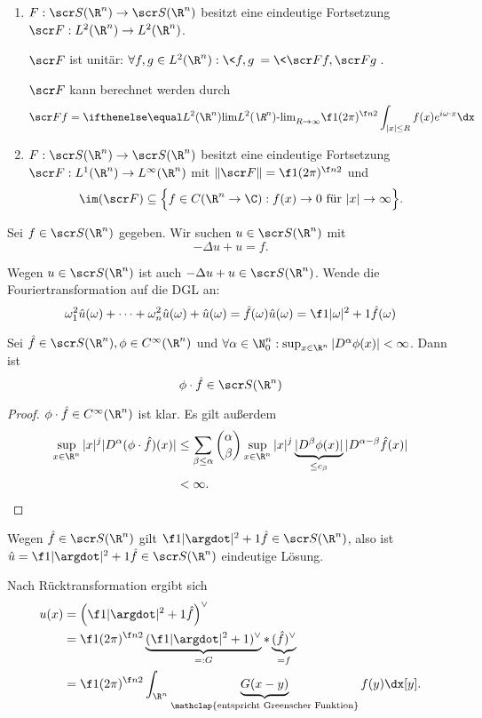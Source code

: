 \begin{nt}[Fortsetzungen] \label{4.31}
	\begin{enumerate}[1)]
		\item
			$F: \scr S(\R^n) \to \scr S(\R^n)$ besitzt eine eindeutige Fortsetzung $\scr F: L^2(\R^n) \to L^2(\R^n)$.

			$\scr F$ ist unitär: $\forall f, g \in L^2(\R^n) : \<f,g\> = \<\scr F f, \scr F g\>$.

			$\scr F$ kann berechnet werden durch
			\[
				\scr F f = \lim[L^2(\R^n)]_{R\to \infty} \f 1{(2\pi)^{\f n2}} \int_{|x|\le R} f(x) e^{i \omega\cdot x} \dx
			\]
		\item
			$F : \scr S(\R^n) \to \scr S(\R^n)$ besitzt eine eindeutige Fortsetzung $\scr F: L^1(\R^n) \to L^\infty(\R^n)$ mit $\| \scr F \| = \f 1{(2\pi)^{\f n2}}$ und
			\[
				\im (\scr F) \subset \Big\{ f \in C(\R^n \to \C) : f(x) \to 0 \text{ für $|x| \to \infty$} \Big\}.
			\]
	\end{enumerate}
\end{nt}

\begin{ex} \label{4.30}
	Sei $f \in \scr S(\R^n)$ gegeben.
	Wir suchen $u \in \scr S(\R^n)$ mit
	\[
		- \Delta u + u = f.
	\]

	Wegen $u \in \scr S(\R^n)$ ist auch $-\Delta u + u \in \scr S(\R^n)$.
	Wende die Fouriertransformation auf die DGL an:
	\[
		\omega_1^2 \hat u(\omega) + \dotsb + \omega_n^2 \hat u(\omega) + \hat u(\omega) = \hat f(\omega)
		\hat u (\omega) = \f 1{|\omega|^2 + 1} \hat f(\omega)
	\]

	\begin{st*}
		Sei $\hat f \in \scr S(\R^n), \phi \in C^\infty(\R^n)$ und $\forall \alpha \in \N_0^n : \sup_{x\in \R^n} |D^\alpha \phi(x)| < \infty$.
		Dann ist
		\[
			\phi \cdot \hat f \in \scr S(\R^n)
		\]
		\begin{proof}
			$\phi \cdot \hat f \in C^\infty(\R^n)$ ist klar.
			Es gilt außerdem
			\begin{align*}
				\sup_{x \in \R^n} |x|^j |D^\alpha (\phi \cdot \hat f)(x) |
				&\le \sum_{\beta \le \alpha} \binom{\alpha}{\beta} \sup_{x \in \R^n} |x|^j \underbrace{|D^\beta \phi(x)|}_{\le c_\beta} | D^{\alpha-\beta} \hat f(x)| \\
				&< \infty.
			\end{align*}
		\end{proof}
	\end{st*}

	Wegen $\hat f \in \scr S(\R^n)$ gilt $\f 1{|\argdot|^2+1} \hat f \in \scr S(\R^n)$, also ist $\hat u = \f 1{|\argdot|^2+1} \hat f \in \scr S(\R^n)$ eindeutige Lösung.

	Nach Rücktransformation ergibt sich
	\begin{align*}
		u(x)
		&= \Big( \f 1{|\argdot|^2+1} \hat f \Big)^\vee \\
		&=  \f 1{(2\pi)^{\f n2}} \underbrace{(\f 1{|\argdot|^2+1})^\vee}_{=:G} \ast \underbrace{(\hat f)^\vee}_{=f}\\
		&= \f 1{(2\pi)^{\f n2}} \int_{\R^n} \underbrace{G(x-y)}_{\mathclap{\text{entspricht Greenscher Funktion}}} f(y) \dx[y].
	\end{align*}
\end{ex}

